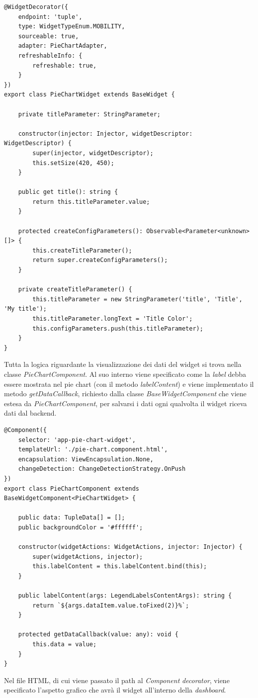 \begin{lstlisting}[caption={Classe PieChartWidget}, style=javaScriptCode]
@WidgetDecorator({
    endpoint: 'tuple',
    type: WidgetTypeEnum.MOBILITY,
    sourceable: true,
    adapter: PieChartAdapter,
    refreshableInfo: {
        refreshable: true,
    }
})
export class PieChartWidget extends BaseWidget {

    private titleParameter: StringParameter;

    constructor(injector: Injector, widgetDescriptor: WidgetDescriptor) {
        super(injector, widgetDescriptor);
        this.setSize(420, 450);
    }

    public get title(): string {
        return this.titleParameter.value;
    }

    protected createConfigParameters(): Observable<Parameter<unknown>[]> {
        this.createTitleParameter();
        return super.createConfigParameters();
    }

    private createTitleParameter() {
        this.titleParameter = new StringParameter('title', 'Title', 'My title');
        this.titleParameter.longText = 'Title Color';
        this.configParameters.push(this.titleParameter);
    }
}

\end{lstlisting}
Tutta la logica riguardante la visualizzazione dei dati del widget si trova nella classe \textit{PieChartComponent}. Al suo interno viene specificato come la \textit{label} debba essere mostrata nel pie chart (con il metodo \textit{labelContent}) e viene implementato il metodo \textit{getDataCallback}, richiesto dalla classe \textit{BaseWidgetComponent} che viene estesa da \textit{PieChartComponent}, per salvarsi i dati ogni qualvolta il widget riceva dati dal backend.

\begin{lstlisting}[caption={Classe PieChartComponent}, style=javaScriptCode]
@Component({
    selector: 'app-pie-chart-widget',
    templateUrl: './pie-chart.component.html',
    encapsulation: ViewEncapsulation.None,
    changeDetection: ChangeDetectionStrategy.OnPush
})
export class PieChartComponent extends BaseWidgetComponent<PieChartWidget> {

    public data: TupleData[] = [];
    public backgroundColor = '#ffffff';

    constructor(widgetActions: WidgetActions, injector: Injector) {
        super(widgetActions, injector);
        this.labelContent = this.labelContent.bind(this);
    }

    public labelContent(args: LegendLabelsContentArgs): string {
        return `${args.dataItem.value.toFixed(2)}%`;
    }

    protected getDataCallback(value: any): void {
        this.data = value;
    }
}
\end{lstlisting}
Nel file HTML, di cui viene passato il path al \textit{Component} \textit{decorator}, viene specificato l'aspetto grafico che avrà il widget all'interno della \textit{dashboard}.

